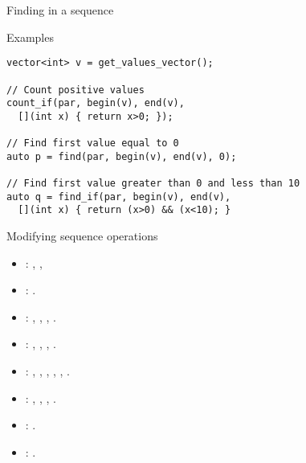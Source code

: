 \begin{frame}[t,fragile]{Finding in a sequence}
\begin{block}{Examples}
\begin{lstlisting}[]
vector<int> v = get_values_vector();

// Count positive values
count_if(par, begin(v), end(v), 
  [](int x) { return x>0; });

// Find first value equal to 0
auto p = find(par, begin(v), end(v), 0);

// Find first value greater than 0 and less than 10
auto q = find_if(par, begin(v), end(v),
  [](int x) { return (x>0) && (x<10); }
\end{lstlisting}
\end{block}
\end{frame}

\begin{frame}[t,allowframebreaks]{Modifying sequence operations}
\begin{itemize}
  \item {}:
    ,
    ,
  \item {}:
    .
  \item {}:
    ,
    ,
    ,
    .
  \item {}:
    ,
    ,
    ,
    .
  \item {}:
    ,
    ,
    ,
    ,
    ,
    .
  \item {}:
    ,
    ,
    ,
    .
  \item {}: .
  \item {}: .
\end{itemize}
\end{frame}

